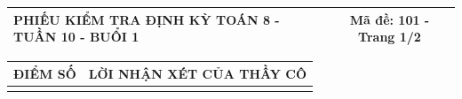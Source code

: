 \documentclass[12pt,a4paper]{article}
\begin{document}
\pagestyle{empty}
\noindent
\begin{tabularx}{\linewidth}{|X|c|}
\hline
\textbf{PHIẾU KIỂM TRA ĐỊNH KỲ TOÁN 8 - TUẦN 10 - BUỔI 1} & \textbf{Mã đề: 101 - Trang 1/2} \\
\hline
\end{tabularx}

\vspace{1.2mm}

\noindent
\begin{tabularx}{\linewidth}{|p{3.2cm}|X|}
\hline
\centering\textbf{ĐIỂM SỐ} & \centering\textbf{LỜI NHẬN XÉT CỦA THẦY CÔ} \tabularnewline
\hline
\rule{0pt}{1.8cm} & \tabularnewline
\hline
\end{tabularx}
\end{document}
